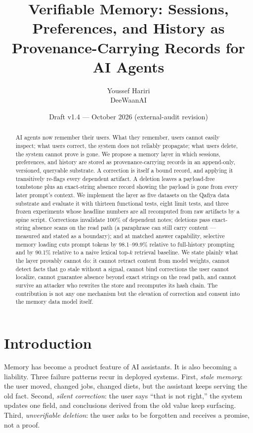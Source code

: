 \documentclass[11pt]{article}
\title{\textbf{Verifiable Memory: Sessions, Preferences, and History as\\ Provenance-Carrying Records for AI Agents}}
\author{Youssef Hariri\\ DeeWaanAI}
\date{Draft v1.4 --- October 2026 (external-audit revision)}
\begin{document}
\maketitle

\begin{abstract}
\noindent AI agents now remember their users. What they remember, users cannot easily inspect; what users correct, the system does not reliably propagate; what users delete, the system cannot prove is gone. We propose a memory layer in which sessions, preferences, and history are stored as provenance-carrying records in an append-only, versioned, queryable substrate. A correction is itself a bound record, and applying it transitively re-flags every dependent artifact. A deletion leaves a payload-free tombstone plus an exact-string absence record showing the payload is gone from every later prompt's context. We implement the layer as five datasets on the Qafiya data substrate and evaluate it with thirteen functional tests, eight limit tests, and three frozen experiments whose headline numbers are all recomputed from raw artifacts by a spine script. Corrections invalidate 100\% of dependent notes; deletions pass exact-string absence scans on the read path (a paraphrase can still carry content --- measured and stated as a boundary); and at matched answer capability, selective memory loading cuts prompt tokens by 98.1--99.9\% relative to full-history prompting and by 90.1\% relative to a naive lexical top-$k$ retrieval baseline. We state plainly what the layer provably cannot do: it cannot retract content from model weights, cannot detect facts that go stale without a signal, cannot bind corrections the user cannot localize, cannot guarantee absence beyond exact strings on the read path, and cannot survive an attacker who rewrites the store and recomputes its hash chain. The contribution is not any one mechanism but the elevation of correction and consent into the memory data model itself.
\end{abstract}

\section{Introduction}
Memory has become a product feature of AI assistants. It is also becoming a liability. Three failure patterns recur in deployed systems. First, \emph{stale memory}: the user moved, changed jobs, changed diets, but the assistant keeps serving the old fact. Second, \emph{silent correction}: the user says ``that is not right,'' the system updates one field, and conclusions derived from the old value keep surfacing. Third, \emph{unverifiable deletion}: the user asks to be forgotten and receives a promise, not a proof.
\end{document}
